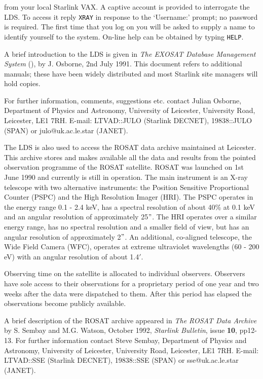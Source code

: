 from your local Starlink VAX. A captive account is provided to 
interrogate the LDS. To access it reply \verb-XRAY- in response to the 
`Username:' prompt; no password is required. The first time that you log
on you will be asked to supply a name to identify yourself to the 
system. On-line help can be obtained by typing \verb-HELP-.

A brief introduction to the LDS is given in {\it The EXOSAT Database 
Management System} 
\newline
(), by J. Osborne, 2nd July 1991. This document refers 
to additional manuals; these have been widely distributed and most 
Starlink site managers will hold copies.

For further information, comments, suggestions etc. contact Julian
Osborne, Department of Physics and Astronomy, University of Leicester, 
University Road, Leicester, LE1 7RH. E-mail: LTVAD::JULO (Starlink
DECNET), 19838::JULO (SPAN) or julo@uk.ac.le.star (JANET).

The LDS is also used to access the ROSAT data archive maintained at 
Leicester. This archive stores and makes available all the data and 
results from the pointed observation programme of the ROSAT satellite. 
ROSAT was launched on 1st June 1990 and currently is still in operation.
The main instrument is an X-ray telescope with two alternative 
instruments: the Position Sensitive Proportional Counter (PSPC) and the 
High Resolution Imager (HRI). The PSPC operates in the energy range 
0.1 - 2.4 keV, has a spectral resolution of about 40\% at 0.1 keV and an
angular resolution of approximately 25$"$. The HRI operates over a 
similar energy range, has no spectral resolution and a smaller field of 
view, but has an angular resolution of approximately 2$"$. An 
additional, co-aligned telescope, the Wide Field Camera (WFC), operates 
at extreme ultraviolet wavelengths (60 - 200 eV) with an angular 
resolution of about 1.4$'$.

Observing time on the satellite is allocated to individual observers.
Observers have sole access to their observations for a proprietary
period of one year and two weeks after the data were dispatched to them.
After this period has elapsed the observations become publicly 
available.

A brief description of the ROSAT archive appeared in {\it The ROSAT
Data Archive} by S. Sembay and M.G. Watson, October 1992, {\it 
Starlink Bulletin}, issue {\bf 10}, pp12-13. For further information
contact Steve Sembay, Department of Physics and Astronomy, University 
of Leicester, University Road, Leicester, LE1 7RH. E-mail: LTVAD::SSE
(Starlink DECNET), 19838::SSE (SPAN) or sse@uk.ac.le.star (JANET).


